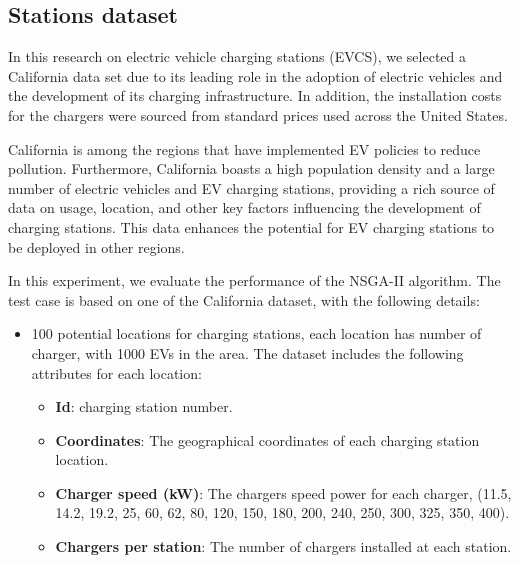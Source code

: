 \subsection{Stations dataset}
In this research on electric vehicle charging stations (EVCS), we selected a California data set due to its leading role in the adoption of electric vehicles and the development of its charging infrastructure. In addition, the installation costs for the chargers were sourced from standard prices used across the United States.

California is among the regions that have implemented EV policies to reduce pollution. Furthermore, California boasts a high population density and a large number of electric vehicles and EV charging stations, providing a rich source of data on usage, location, and other key factors influencing the development of charging stations. This data enhances the potential for EV charging stations to be deployed in other regions.

In this experiment, we evaluate the performance of the NSGA-II algorithm. The test case is based on one of the California dataset, with the following details:


\begin{itemize}
    \item 100 potential locations for charging stations, each location has number of charger, with 1000 EVs in the area. The dataset includes the following attributes for each location:
    \begin{itemize}
        \item \textbf{Id}: charging station number.
        \item \textbf{Coordinates}: The geographical coordinates of each charging station location.
        \item \textbf{Charger speed (kW)}: The chargers speed power for each charger, (11.5, 14.2, 19.2, 25, 60, 62, 80, 120, 150, 180, 200, 240, 250, 300, 325, 350, 400).
        \item \textbf{Chargers per station}: The number of chargers installed at each station.
    \end{itemize}
\end{itemize}


